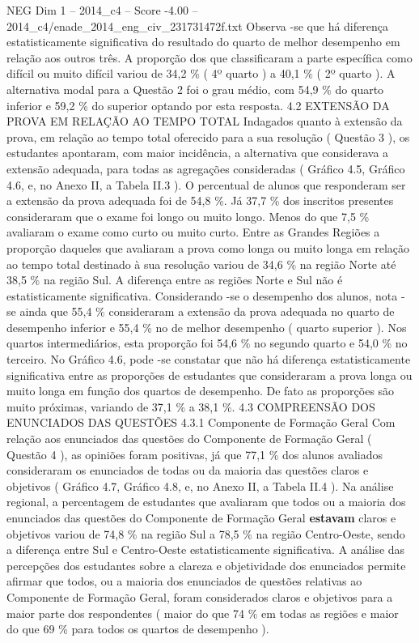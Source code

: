 \begin{textsample}{NEG Dim 1 – 2014\_c4 – Score -4.00 – 2014\_c4/enade\_2014\_eng\_civ\_231731472f.txt}
Observa -se que há diferença estatisticamente significativa do resultado do quarto de melhor desempenho em relação aos outros três.
A proporção dos que classificaram a parte específica como difícil ou muito difícil variou de 34,2 \% ( 4º quarto ) a 40,1 \% ( 2º quarto ).
A alternativa modal para a Questão 2 foi o grau médio, com 54,9 \% do quarto inferior e 59,2 \% do superior optando por esta resposta. 4.2 EXTENSÃO DA PROVA EM RELAÇÃO AO TEMPO TOTAL Indagados quanto à extensão da prova, em relação ao tempo total oferecido para a sua resolução ( Questão 3 ), os estudantes apontaram, com maior incidência, a alternativa que considerava a extensão adequada, para todas as agregações consideradas ( Gráfico 4.5, Gráfico 4.6, e, no Anexo II, a Tabela II.3 ).
O percentual de alunos que responderam ser a extensão da prova adequada foi de 54,8 \%.
Já 37,7 \% dos inscritos presentes consideraram que o exame foi longo ou muito longo.
Menos do que 7,5 \% avaliaram o exame como curto ou muito curto.
Entre as Grandes Regiões a proporção daqueles que avaliaram a prova como longa ou muito longa em relação ao tempo total destinado à sua resolução variou de 34,6 \% na região Norte até 38,5 \% na região Sul.
A diferença entre as regiões Norte e Sul não é estatisticamente significativa.
Considerando -se o desempenho dos alunos, nota -se ainda que 55,4 \% consideraram a extensão da prova adequada no quarto de desempenho inferior e 55,4 \% no de melhor desempenho ( quarto superior ).
Nos quartos intermediários, esta proporção foi 54,6 \% no segundo quarto e 54,0 \% no terceiro.
No Gráfico 4.6, pode -se constatar que não há diferença estatisticamente significativa entre as proporções de estudantes que consideraram a prova longa ou muito longa em função dos quartos de desempenho.
De fato as proporções são muito próximas, variando de 37,1 \% a 38,1 \%. 4.3 COMPREENSÃO DOS ENUNCIADOS DAS QUESTÕES 4.3.1 Componente de Formação Geral Com relação aos enunciados das questões do Componente de Formação Geral ( Questão 4 ), as opiniões foram positivas, já que 77,1 \% dos alunos avaliados consideraram os enunciados de todas ou da maioria das questões claros e objetivos ( Gráfico 4.7, Gráfico 4.8, e, no Anexo II, a Tabela II.4 ).
Na análise regional, a percentagem de estudantes que avaliaram que todos ou a maioria dos enunciados das questões do Componente de Formação Geral \textbf{estavam} claros e objetivos variou de 74,8 \% na região Sul a 78,5 \% na região Centro-Oeste, sendo a diferença entre Sul e Centro-Oeste estatisticamente significativa.
A análise das percepções dos estudantes sobre a clareza e objetividade dos enunciados permite afirmar que todos, ou a maioria dos enunciados de questões relativas ao Componente de Formação Geral, foram considerados claros e objetivos para a maior parte dos respondentes ( maior do que 74 \% em todas as regiões e maior do que 69 \% para todos os quartos de desempenho ).

\end{textsample}
